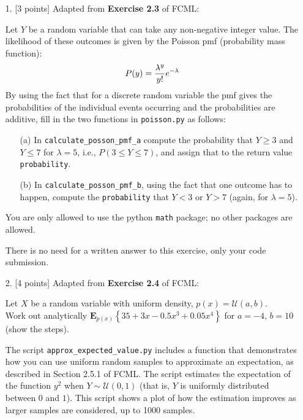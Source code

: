 \documentclass[10pt]{article}
\begin{document}
\newpage
\begin{itemize}

\item[1.] [3 points]
Adapted from {\bf Exercise 2.3} of FCML:

Let $Y$ be a random variable that can take any non-negative integer value.  The likelihood of these outcomes is given by the Poisson pmf (probability mass function):
\begin{eqnarray}
P(y) = {\lambda^y\over y!} e^{-\lambda}
\end{eqnarray}
By using the fact that for a discrete random variable the pmf gives the probabilities of the individual events occurring and the probabilities are additive, fill in the two functions in {\tt poisson.py} as follows:
\begin{enumerate}
\item[(a)] In {\tt calculate\_posson\_pmf\_a} compute the probability that $Y \geq 3$ and $Y \leq 7$ for $\lambda = 5$, i.e., $P(3 \leq Y \leq 7)$, and assign that to the return value {\tt probability}.
\item[(b)] In {\tt calculate\_posson\_pmf\_b}, using the fact that one outcome has to happen, compute the {\tt probability} that $Y < 3$ or $Y > 7$ (again, for $\lambda = 5$).
\end{enumerate}
You are only allowed to use the python {\tt math} package; no other packages are allowed.

There is no need for a written answer to this exercise, only your code submission.



\item[2.] [4 points]
Adapted from {\bf Exercise 2.4} of FCML:

Let $X$ be a random variable with uniform density, $p(x) = \mathcal{U}(a,b)$.  \\
Work out analytically $\mathbf{E}_{p(x)} \left\{ 35 + 3x - 0.5x^3 + 0.05x^4 \right\}$ for $a=-4$, $b=10$ (show the steps).  

The script {\tt approx\_expected\_value.py} includes a function that demonstrates how you can use uniform random samples to approximate an expectation, as described in Section 2.5.1 of FCML.  The script estimates the expectation of the function $y^2$ when $Y \sim \mathcal{U}(0,1)$ (that is, $Y$ is uniformly distributed between $0$ and $1$).  This script shows a plot of how the estimation improves as larger samples are considered, up to 1000 samples.


\end{itemize}
\end{document}
